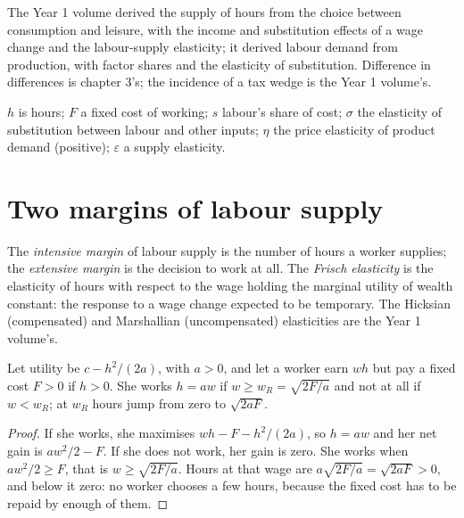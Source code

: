 \begin{recall}
The Year 1 volume derived the supply of hours from the choice between consumption
and leisure, with the income and substitution effects of a wage change and the
labour-supply elasticity; it derived labour demand from production, with factor
shares and the elasticity of substitution. Difference in differences is chapter 3's;
the incidence of a tax wedge is the Year 1 volume's.
\end{recall}

\begin{notation}\label{not:b3:labour-supply-and-demand:symbols}
$h$ is hours; $F$ a fixed cost of working; $s$ labour's share of cost; $\sigma$ the elasticity
of substitution between labour and other inputs; $\eta$ the price elasticity of
product demand (positive); $\varepsilon$ a supply elasticity.
\end{notation}

\section{Two margins of labour supply}\label{sec:b3:labour-supply-and-demand:margins}

\begin{definition}\label{def:b3:labour-supply-and-demand:frisch}
The \emph{intensive margin} of labour supply is the number of hours a worker
supplies; the \emph{extensive margin} is the decision to work at all. The
\emph{Frisch elasticity} is the elasticity of hours with respect to the wage holding
the marginal utility of wealth constant: the response to a wage change expected to
be temporary. The Hicksian (compensated) and Marshallian (uncompensated)
elasticities are the Year 1 volume's.
\end{definition}

\begin{proposition}\label{prop:b3:labour-supply-and-demand:fixed-cost}
Let utility be $c - h^2/(2a)$, with $a > 0$, and let a worker earn $wh$ but pay a fixed cost $F > 0$
if $h > 0$. She works $h = aw$ if $w \ge w_R = \sqrt{2F/a}$ and not at all if $w < w_R$; at $w_R$ hours jump from zero to
$\sqrt{2aF}$.
\end{proposition}

\begin{proof}
If she works, she maximises $wh - F - h^2/(2a)$, so $h = aw$ and her net gain is $aw^2/2 - F$. If she does not
work, her gain is zero. She works when $aw^2/2 \ge F$, that is $w \ge \sqrt{2F/a}$. Hours at that wage are $a\sqrt{2F/a}
= \sqrt{2aF} > 0$, and below it zero: no worker chooses a few hours, because the fixed cost
has to be repaid by enough of them.
\end{proof}

